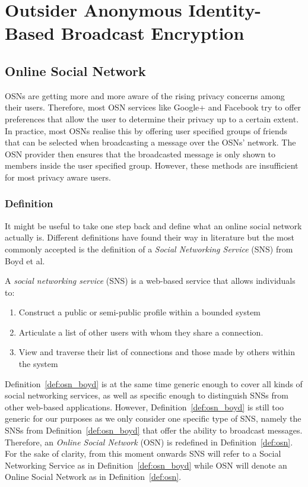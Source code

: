 \chapter{Outsider Anonymous Identity-Based Broadcast Encryption}
\label{cha:n}

\section{Online Social Network}
OSNs are getting more and more aware of the rising privacy concerns among their users. Therefore, most OSN services like Google+ and Facebook try to offer preferences that allow the user to determine their privacy up to a certain extent. In practice, most OSNs realise this by offering user specified groups of friends that can be selected when broadcasting a message over the OSNs' network. The OSN provider then ensures that the broadcasted message is only shown to members inside the user specified group. However, these methods are insufficient for most privacy aware users.

\subsection{Definition}
It might be useful to take one step back and define what an online social network actually is. Different definitions have found their way in literature but the most commonly accepted is the definition of a \textit{Social Networking Service} (SNS) from Boyd et al.~\cite{art:BoydE08}

\begin{defn}
\label{def:osn_boyd}
 A \textit{social networking service} (SNS) is a web-based service that allows individuals to:
 \begin{enumerate}
  \item Construct a public or semi-public profile within a bounded system
  \item Articulate a list of other users with whom they share a connection.
  \item View and traverse their list of connections and those made by others within the system
  \setcounter{enumTemp}{\theenumi}
 \end{enumerate}
\end{defn}

Definition~\ref{def:osn_boyd} is at the same time generic enough to cover all kinds of social networking services, as well as specific enough to distinguish SNSs from other web-based applications. However, Definition~\ref{def:osn_boyd} is still too generic for our purposes as we only consider one specific type of SNS, namely the SNSs from Definition~\ref{def:osn_boyd} that offer the ability to broadcast messages. Therefore, an \textit{Online Social Network} (OSN) is redefined in Definition~\ref{def:osn}. For the sake of clarity, from this moment onwards SNS will refer to a Social Networking Service as in Definition~\ref{def:osn_boyd} while OSN will denote an Online Social Network as in Definition~\ref{def:osn}.

